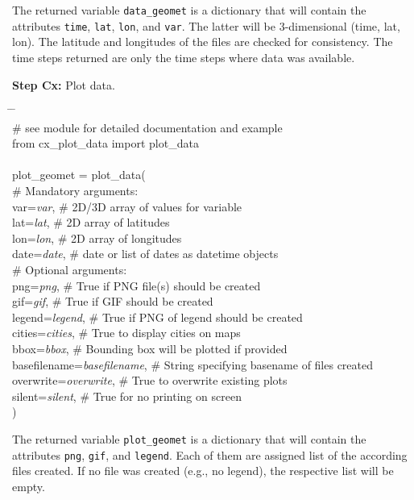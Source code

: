 \documentclass[10pt,a4paper,titlepage,parskip]{scrartcl}
\newenvironment{ttfont}{\fontfamily{\ttdefault}\selectfont}{\par}
\newcommand{\GRAU}[1]{\textcolor{ufzgray2}{#1}}
\begin{document}
\vspace*{-0.3cm}
The returned variable \texttt{data\_geomet} is a dictionary that will contain the attributes \texttt{time}, \texttt{lat}, \texttt{lon}, and \texttt{var}. The latter will be 3-dimensional (time, lat, lon). The latitude and longitudes of the files are checked for consistency. The time steps returned are only the time steps where data was available.

\textbf{Step Cx:} Plot data.
\begin{framed}
	\vspace*{-1.2cm}
	\begin{ttfont}
		\begin{tabbing}
			\hspace{1.0cm} \= \hspace{5.2cm} \= \kill \\[4pt]
			\GRAU{\# see module for detailed documentation and example}\\
			from cx\_plot\_data import plot\_data\\
			\\
			plot\_geomet = plot\_data(\\
			\> \GRAU{\# Mandatory arguments:}\\
			\> var=\textit{var}, \> \GRAU{\# 2D/3D array of values for variable}\\
			\> lat=\textit{lat}, \> \GRAU{\# 2D array of latitudes}\\
			\> lon=\textit{lon}, \> \GRAU{\# 2D array of longitudes}\\
			\> date=\textit{date}, \> \GRAU{\# date or list of dates as datetime objects}\\
			\> \GRAU{\# Optional arguments:}\\
			\> png=\textit{png}, \> \GRAU{\# True if PNG file(s) should be created}\\
			\> gif=\textit{gif}, \> \GRAU{\# True if GIF should be created}\\
			\> legend=\textit{legend}, \> \GRAU{\# True if PNG of legend should be created}\\
			\> cities=\textit{cities}, \> \GRAU{\# True to display cities on maps}\\
			\> bbox=\textit{bbox}, \> \GRAU{\# Bounding box will be plotted if provided}\\
			\> basefilename=\textit{basefilename}, \> \GRAU{\# String specifying basename of files created}\\
			\> overwrite=\textit{overwrite}, \> \GRAU{\# True to overwrite existing plots}\\
			\> silent=\textit{silent}, \> \GRAU{\# True for no printing on screen}\\
			\> ) \> 
		\end{tabbing}
	\end{ttfont}
	\vspace*{-0.3cm}
\end{framed}
\vspace*{-0.3cm}
The returned variable \texttt{plot\_geomet} is a dictionary that will contain the attributes \texttt{png}, \texttt{gif}, and \texttt{legend}. Each of them are assigned list of the according files created. If no file was created (e.g., no legend), the respective list will be empty.
\end{document}
